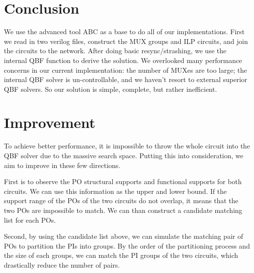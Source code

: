 \section{Conclusion}
We use the advanced tool ABC as a base to do all of our implementations. First we read in two verilog files, construct the MUX groups and ILP circuits, and join the circuits to the network. After doing basic resync/strashing, we use the internal QBF function to derive the solution.
We overlooked many performance concerns in our current implementation: the number of MUXes are too large; the internal QBF solver is un-controllable, and we haven't resort to external superior QBF solvers.
So our solution is simple, complete, but rather inefficient.

\section{Improvement}
To achieve better performance, it is impossible to throw the whole circuit into the QBF solver due to the massive search space. Putting this into consideration, we aim to improve in these few directions.

First is to observe the PO structural supports and functional supports for both circuits. We can use this information as the upper and lower bound. If the support range of the POs of the two circuits do not overlap, it means that the two POs are impossible to match. We can than construct a candidate matching list for each POs.

Second, by using the candidate list above, we can simulate the matching pair of POs to partition the PIs into groups. By the order of the partitioning process and the size of each groups, we can match the PI groups of the two circuits, which drastically reduce the number of pairs.

